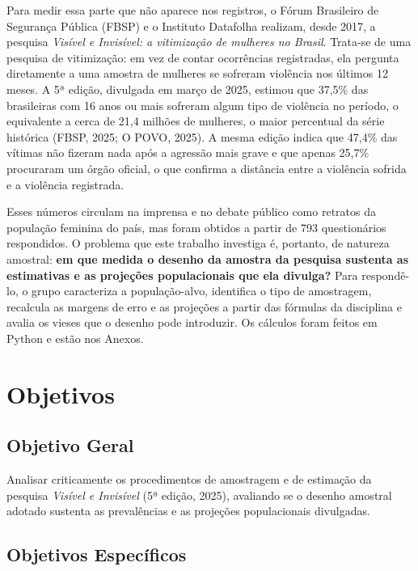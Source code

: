 \documentclass[12pt,a4paper]{article}
\begin{document}
Para medir essa parte que não aparece nos registros, o Fórum Brasileiro de Segurança Pública (FBSP) e o Instituto Datafolha realizam, desde 2017, a pesquisa \textit{Visível e Invisível: a vitimização de mulheres no Brasil}. Trata-se de uma pesquisa de vitimização: em vez de contar ocorrências registradas, ela pergunta diretamente a uma amostra de mulheres se sofreram violência nos últimos 12 meses. A 5ª edição, divulgada em março de 2025, estimou que 37,5\% das brasileiras com 16 anos ou mais sofreram algum tipo de violência no período, o equivalente a cerca de 21,4 milhões de mulheres, o maior percentual da série histórica (FBSP, 2025; O POVO, 2025). A mesma edição indica que 47,4\% das vítimas não fizeram nada após a agressão mais grave e que apenas 25,7\% procuraram um órgão oficial, o que confirma a distância entre a violência sofrida e a violência registrada.

Esses números circulam na imprensa e no debate público como retratos da população feminina do país, mas foram obtidos a partir de 793 questionários respondidos. O problema que este trabalho investiga é, portanto, de natureza amostral: \textbf{em que medida o desenho da amostra da pesquisa sustenta as estimativas e as projeções populacionais que ela divulga?} Para respondê-lo, o grupo caracteriza a população-alvo, identifica o tipo de amostragem, recalcula as margens de erro e as projeções a partir das fórmulas da disciplina e avalia os vieses que o desenho pode introduzir. Os cálculos foram feitos em Python e estão nos Anexos.

\newpage

\section{Objetivos}

\subsection{Objetivo Geral}

Analisar criticamente os procedimentos de amostragem e de estimação da pesquisa \textit{Visível e Invisível} (5ª edição, 2025), avaliando se o desenho amostral adotado sustenta as prevalências e as projeções populacionais divulgadas.

\subsection{Objetivos Específicos}
\end{document}
